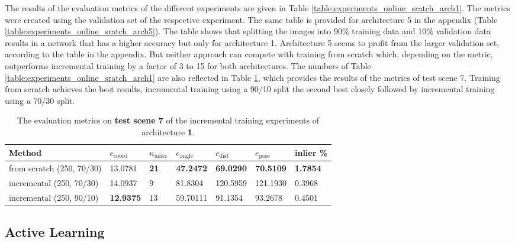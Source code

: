 The results of the evaluation metrics of the different experiments are given in Table \ref{table:experiments_online_sratch_arch1}. The metrics were created using the validation set of the respective experiment. The same table is provided for architecture 5 in the appendix (Table \ref{table:experiments_online_sratch_arch5}). The table shows that splitting the images into 90\% training data and 10\% validation data results in a network that has a higher accuracy but only for architecture 1. Architecture 5 seems to profit from the larger validation set, according to the table in the appendix. But neither approach can compete with training from scratch which, depending on the metric, outperforms incremental training by a factor of 3 to 15 for both architectures. The numbers of Table \ref{table:experiments_online_sratch_arch1} are also reflected in Table \ref{table:experiments_online_scratch_arch1_test_set}, which provides the results of the metrics of test scene 7. Training from scratch achieves the best results, incremental training using a 90/10 split the second best closely followed by incremental training using a 70/30 split.

\begin{table}[]
\centering
\begin{tabular}{|l||llllll|} \hline 
Method   & $e_{\text{coord}}$ & $n_{\text{inlier}}$ & $e_{\text{angle}}$ & $e_{\text{dist}}$ & $e_{\text{pose}}$  & inlier \% \\ \hline \hline  \rowcolor{Gray}
from scratch (250, 70/30)       & 13.0781             & \textbf{21}                 & \textbf{47.2472}  &\textbf{69.0290}          & \textbf{70.5109}            & \textbf{1.7854}            \\ 
incremental (250, 70/30) & 14.0937             & 9                  & 81.8304             & 120.5959           & 121.1930 & 0.3968         \\  \rowcolor{Gray}
incremental (250, 90/10) & \textbf{12.9375}             & 13                 & 59.70111            & 91.1354            & 93.2678   & 0.4501      \\ \hline 
\end{tabular}
\caption{The evaluation metrics on \textbf{test scene 7} of the incremental training experiments of architecture \textbf{1}.}
\label{table:experiments_online_scratch_arch1_test_set}
\end{table}

\subsection{Active Learning} \label{subsection:experiments_active_learning}

